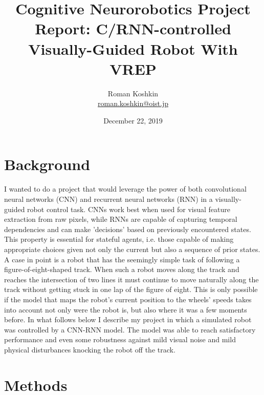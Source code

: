 \documentclass[11pt, oneside]{article}   	%
\title{Cognitive Neurorobotics Project Report: C/RNN-controlled Visually-Guided Robot With VREP}
\author{Roman Koshkin\\ \href{mailto:roman.koshkin@oist.jp}{roman.koshkin@oist.jp}}
\date{December 22, 2019}
\begin{document}
\maketitle
\section{Background}
I wanted to do a project that would leverage the power of both convolutional neural networks (CNN) and recurrent neural networks (RNN) in a visually-guided robot control task. CNNs work best when used for visual feature extraction from raw pixels, while RNNs are capable of capturing temporal dependencies and can make 'decisions' based on previously encountered sta\-tes. This property is essential for stateful agents, i.e. those capable of making appropriate choices given not only the current but also a sequence of prior states. A case in point is a robot that has the seemingly simple task of following a figure-of-eight-shaped track. When such a robot moves along the track and reaches the intersection of two lines it must continue to move naturally along the track without getting stuck in one lap of the figure of eight. This is only possible if the model that maps the robot's current position to the wheels' speeds takes into account not only were the robot is, but also where it was a few moments before. In what follows below I describe my project in which a simulated robot was controlled by a CNN-RNN model. The model was able to reach satisfactory performance and even some robustness against mild visual noise and mild physical disturbances knocking the robot off the track.

\section{Methods}
\end{document}
